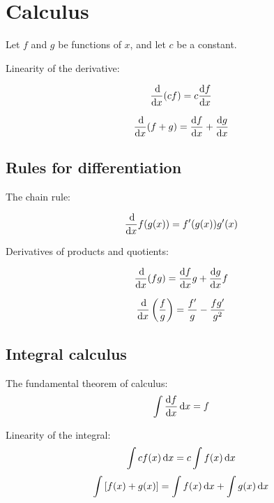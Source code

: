 {}
\setcounter{section}{3}
\section*{Calculus}

\noindent Let $f$ and $g$ be functions of $x$, and let $c$ be a constant.

\noindent Linearity of the derivative:

\begin{equation*} \frac{\operatorname{d\!}}{\operatorname{d\!} x}(cf)=c \frac{\operatorname{d\!} f}{\operatorname{d\!} x} \end{equation*}

\begin{equation*} \frac{\operatorname{d\!}}{\operatorname{d\!} x}(f+g)=\frac{\operatorname{d\!} f}{\operatorname{d\!} x} + \frac{\operatorname{d\!} g}{\operatorname{d\!} x} \end{equation*}

\subsection{Rules for differentiation}

\noindent The chain rule:

\begin{equation*} \frac{\operatorname{d\!}}{\operatorname{d\!} x}f(g(x)) = f'(g(x))g'(x) \end{equation*}

\noindent Derivatives of products and quotients:

\begin{equation*} \frac{\operatorname{d\!}}{\operatorname{d\!} x} (fg) = \frac{\operatorname{d\!} f}{\operatorname{d\!} x} g + \frac{\operatorname{d\!} g}{\operatorname{d\!} x} f\end{equation*}

\begin{equation*} \frac{\operatorname{d\!}}{\operatorname{d\!} x}\left(\frac{f}{g}\right) = \frac{f'}{g}-\frac{fg'}{g^2}\end{equation*}

\subsection{Integral calculus}

\noindent The fundamental theorem of calculus:
\begin{equation*} \int \frac{\operatorname{d\!} f}{\operatorname{d\!} x}\operatorname{d\!} x = f \end{equation*}

\noindent Linearity of the integral:
\begin{equation*} \int cf(x)\operatorname{d\!} x = c\int f(x)\operatorname{d\!} x\end{equation*}
\begin{equation*} \int\left[f(x)+g(x)\right] = \int f(x) \operatorname{d\!} x + \int g(x) \operatorname{d\!} x \end{equation*}


